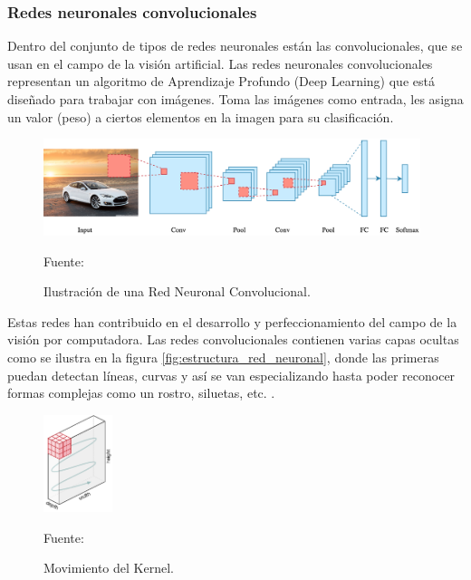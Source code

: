 \subsubsection{Redes neuronales convolucionales}
Dentro del conjunto de tipos de redes neuronales están las convolucionales, que se usan en el campo de la visión artificial. Las redes neuronales convolucionales representan un algoritmo de Aprendizaje Profundo (Deep Learning) que está diseñado para trabajar con imágenes. Toma las imágenes como entrada, les asigna un valor (peso) a ciertos elementos en la imagen para su clasificación.\\

\begin{figure}[H]
    \begin{center}
        \includegraphics[width=11cm]{img/capitulo_2/convolucional.png}
        \caption{Ilustración de una Red Neuronal Convolucional.\\}
        Fuente: \cite{intro_redes_neuronales}
        \label{fig:red_neuronal_convolucional}
    \end{center}
\end{figure}

Estas redes han contribuido en el desarrollo y perfeccionamiento del campo de la visión por computadora. Las redes convolucionales contienen varias capas ocultas como se ilustra en la figura \ref{fig:estructura_red_neuronal}, donde las primeras puedan detectan líneas, curvas y así se van especializando hasta poder reconocer formas complejas como un rostro, siluetas, etc. \cite{convolutional:ia}. \\

\begin{figure}[H]
    \begin{center}
        \includegraphics[width=2cm]{img/capitulo_2/kernel.png}
        \caption{Movimiento del Kernel.\\}
        Fuente: \cite{comprension_redes_neuronales}
        \label{fig:kernel}
    \end{center}
\end{figure}

